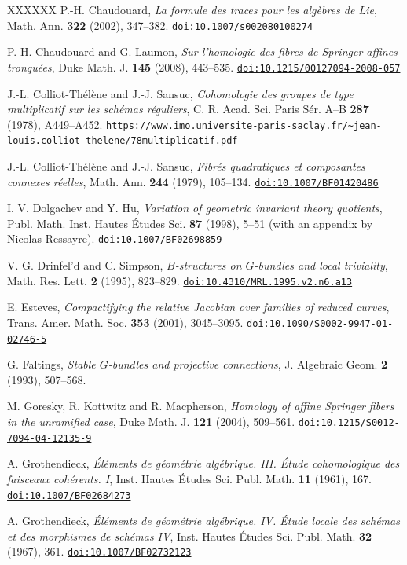 \documentclass[12pt,a4paper,oneside,english,leqno]{smfart}
\newcounter{theo}
\numberwithin{theo}{subsection}
\newcommand{\doi}[1]{\href{https://doi.org/#1}{\texttt{doi:#1}}}
\newcommand{\urlref}[1]{\href{#1}{\nolinkurl{#1}}}
\begin{document}
\begin{thebibliography}{XXXXXX}
 P.-H. Chaudouard, \emph{La formule des traces pour les alg\`ebres de Lie}, Math. Ann. \textbf{322} (2002), 347--382. \doi{10.1007/s002080100274}

 P.-H. Chaudouard and G. Laumon, \emph{Sur l'homologie des fibres de Springer affines tronqu\'ees}, Duke Math. J. \textbf{145} (2008), 443--535. \doi{10.1215/00127094-2008-057}

 J.-L. Colliot-Th\'el\`ene and J.-J. Sansuc, \emph{Cohomologie des groupes de type multiplicatif sur les sch\'emas r\'eguliers}, C. R. Acad. Sci. Paris S\'er. A--B \textbf{287} (1978), A449--A452. \urlref{https://www.imo.universite-paris-saclay.fr/~jean-louis.colliot-thelene/78multiplicatif.pdf}

 J.-L. Colliot-Th\'el\`ene and J.-J. Sansuc, \emph{Fibr\'es quadratiques et composantes connexes r\'eelles}, Math. Ann. \textbf{244} (1979), 105--134. \doi{10.1007/BF01420486}

 I. V. Dolgachev and Y. Hu, \emph{Variation of geometric invariant theory quotients}, Publ. Math. Inst. Hautes \'Etudes Sci. \textbf{87} (1998), 5--51 (with an appendix by Nicolas Ressayre). \doi{10.1007/BF02698859}

 V. G. Drinfel'd and C. Simpson, \emph{$B$-structures on $G$-bundles and local triviality}, Math. Res. Lett. \textbf{2} (1995), 823--829. \doi{10.4310/MRL.1995.v2.n6.a13}

 E. Esteves, \emph{Compactifying the relative Jacobian over families of reduced curves}, Trans. Amer. Math. Soc. \textbf{353} (2001), 3045--3095. \doi{10.1090/S0002-9947-01-02746-5}

 G. Faltings, \emph{Stable $G$-bundles and projective connections}, J. Algebraic Geom. \textbf{2} (1993), 507--568.

 M. Goresky, R. Kottwitz and R. Macpherson, \emph{Homology of affine Springer fibers in the unramified case}, Duke Math. J. \textbf{121} (2004), 509--561. \doi{10.1215/S0012-7094-04-12135-9}

 A. Grothendieck, \emph{\'El\'ements de g\'eom\'etrie alg\'ebrique. III. \'Etude cohomologique des faisceaux coh\'erents. I}, Inst. Hautes \'Etudes Sci. Publ. Math. \textbf{11} (1961), 167. \doi{10.1007/BF02684273}

 A. Grothendieck, \emph{\'El\'ements de g\'eom\'etrie alg\'ebrique. IV. \'Etude locale des sch\'emas et des morphismes de sch\'emas IV}, Inst. Hautes \'Etudes Sci. Publ. Math. \textbf{32} (1967), 361. \doi{10.1007/BF02732123}


\end{thebibliography}
\end{document}

